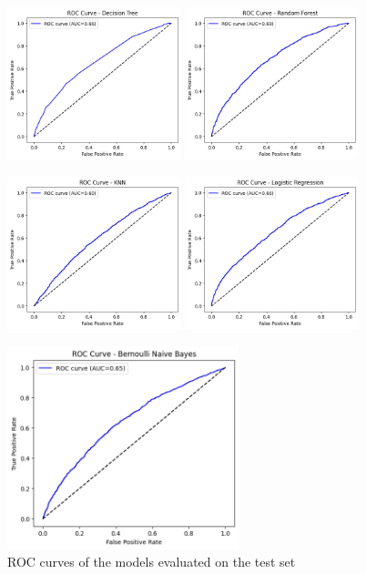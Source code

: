 \begin{figure}[h!]
    \centering
    \includegraphics[width=0.45\textwidth]{images/rocDT.png}
    \includegraphics[width=0.45\textwidth]{images/rocRF.png}

    \includegraphics[width=0.45\textwidth]{images/rocKNN.png}
    \includegraphics[width=0.45\textwidth]{images/rocLR.png}

    \includegraphics[width=0.6\textwidth]{images/rocNB.png}

    \caption{ROC curves of the models evaluated on the test set}
    \label{fig:cinque-immagini}
\end{figure}
